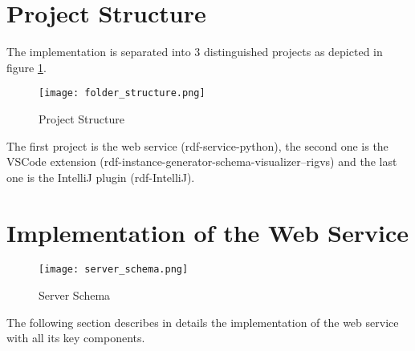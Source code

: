 \section{Project Structure\label{sec:projectstructure}}

The implementation is separated into 3 distinguished projects as depicted in figure \ref{fig:projectstructure}.

\begin{figure}[htb]
  \centering
  \texttt{[image: folder\_structure.png]}
  \caption{Project Structure}
  \label{fig:projectstructure}
\end{figure}

The first project is the web service (rdf-service-python), the second one is the VSCode extension (rdf-instance-generator-schema-visualizer--rigvs) and the last one is the IntelliJ plugin (rdf-IntelliJ).

\section{Implementation of the Web Service\label{sec:webservice}}

\begin{figure}[htb]
	\centering
	\texttt{[image: server\_schema.png]}
	\caption{Server Schema}
	\label{fig:serverschema}
  \end{figure}


\noindent
The following section describes in details the implementation of the web service with all its key components.
\\
\\
